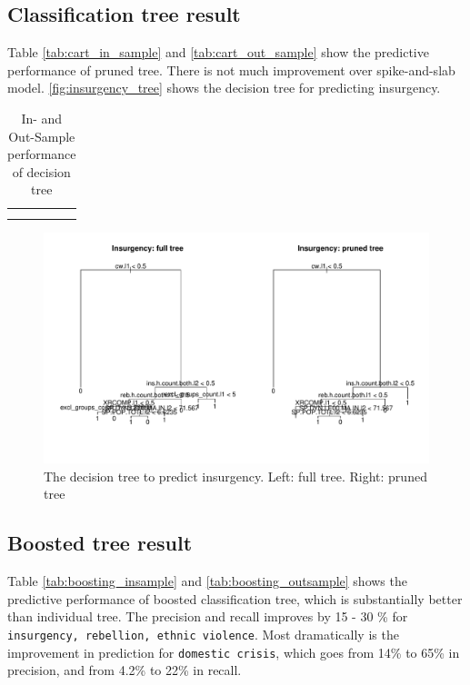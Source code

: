 \documentclass{article}
\begin{document}
\subsection{Classification tree result}

Table \autoref{tab:cart_in_sample} and \autoref{tab:cart_out_sample} show the predictive performance of pruned tree. There is not much improvement over spike-and-slab model. \autoref{fig:insurgency_tree} shows the decision tree for predicting insurgency.							

\begin{table}[!ht]
\centering
\begin{tabular}{c}
\subfloat[In-Sample]{\label{tab:cart_in_sample}
	}\\
\subfloat[Out-Sample]{\label{tab:cart_out_sample}
	}
\end{tabular}
\caption{In- and Out-Sample performance of decision tree}
\end{table}

\begin{figure}[!ht]
\includegraphics[width=\textwidth]{fig/insurgency_tree}
\caption{The decision tree to predict insurgency. Left: full tree. Right: pruned tree}
\label{fig:insurgency_tree}
\end{figure}

\subsection{Boosted tree result}

Table \autoref{tab:boosting_insample} and \autoref{tab:boosting_outsample} shows the predictive performance of boosted classification tree, which is substantially better than individual tree. The precision and recall improves by 15 - 30 \% for \verb|insurgency, rebellion, ethnic violence|. Most dramatically is the improvement in prediction for \verb|domestic crisis|, which goes from 14\% to 65\% in precision, and from 4.2\% to 22\% in recall.
\end{document}
